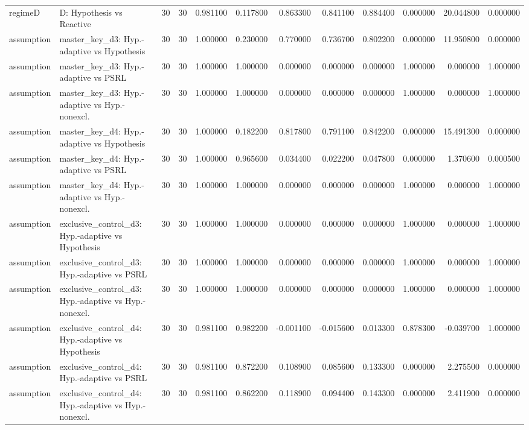 \begin{tabular}{llrrrrrrrrrr}
regimeD & D: Hypothesis vs Reactive & 30 & 30 & 0.981100 & 0.117800 & 0.863300 & 0.841100 & 0.884400 & 0.000000 & 20.044800 & 0.000000 \\
assumption & master\_key\_d3: Hyp.-adaptive vs Hypothesis & 30 & 30 & 1.000000 & 0.230000 & 0.770000 & 0.736700 & 0.802200 & 0.000000 & 11.950800 & 0.000000 \\
assumption & master\_key\_d3: Hyp.-adaptive vs PSRL & 30 & 30 & 1.000000 & 1.000000 & 0.000000 & 0.000000 & 0.000000 & 1.000000 & 0.000000 & 1.000000 \\
assumption & master\_key\_d3: Hyp.-adaptive vs Hyp.-nonexcl. & 30 & 30 & 1.000000 & 1.000000 & 0.000000 & 0.000000 & 0.000000 & 1.000000 & 0.000000 & 1.000000 \\
assumption & master\_key\_d4: Hyp.-adaptive vs Hypothesis & 30 & 30 & 1.000000 & 0.182200 & 0.817800 & 0.791100 & 0.842200 & 0.000000 & 15.491300 & 0.000000 \\
assumption & master\_key\_d4: Hyp.-adaptive vs PSRL & 30 & 30 & 1.000000 & 0.965600 & 0.034400 & 0.022200 & 0.047800 & 0.000000 & 1.370600 & 0.000500 \\
assumption & master\_key\_d4: Hyp.-adaptive vs Hyp.-nonexcl. & 30 & 30 & 1.000000 & 1.000000 & 0.000000 & 0.000000 & 0.000000 & 1.000000 & 0.000000 & 1.000000 \\
assumption & exclusive\_control\_d3: Hyp.-adaptive vs Hypothesis & 30 & 30 & 1.000000 & 1.000000 & 0.000000 & 0.000000 & 0.000000 & 1.000000 & 0.000000 & 1.000000 \\
assumption & exclusive\_control\_d3: Hyp.-adaptive vs PSRL & 30 & 30 & 1.000000 & 1.000000 & 0.000000 & 0.000000 & 0.000000 & 1.000000 & 0.000000 & 1.000000 \\
assumption & exclusive\_control\_d3: Hyp.-adaptive vs Hyp.-nonexcl. & 30 & 30 & 1.000000 & 1.000000 & 0.000000 & 0.000000 & 0.000000 & 1.000000 & 0.000000 & 1.000000 \\
assumption & exclusive\_control\_d4: Hyp.-adaptive vs Hypothesis & 30 & 30 & 0.981100 & 0.982200 & -0.001100 & -0.015600 & 0.013300 & 0.878300 & -0.039700 & 1.000000 \\
assumption & exclusive\_control\_d4: Hyp.-adaptive vs PSRL & 30 & 30 & 0.981100 & 0.872200 & 0.108900 & 0.085600 & 0.133300 & 0.000000 & 2.275500 & 0.000000 \\
assumption & exclusive\_control\_d4: Hyp.-adaptive vs Hyp.-nonexcl. & 30 & 30 & 0.981100 & 0.862200 & 0.118900 & 0.094400 & 0.143300 & 0.000000 & 2.411900 & 0.000000 \\

\end{tabular}
